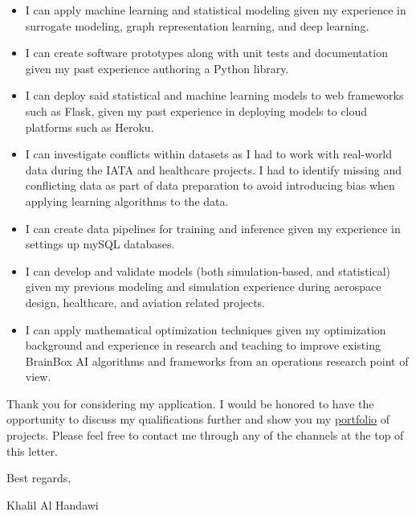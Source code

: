 \documentclass[12pt]{article} %
\begin{document}
\begin{itemize}
	\item I can apply machine learning and statistical modeling given my experience in surrogate modeling, graph representation learning, and deep learning.
	\item I can create software prototypes along with unit tests and documentation given my past experience authoring a Python library.
	\item I can deploy said statistical and machine learning models to web frameworks such as Flask, given my past experience in deploying models to cloud platforms such as Heroku.
	\item I can investigate conflicts within datasets as I had to work with real-world data during the IATA and healthcare projects. I had to identify missing and conflicting data as part of data preparation to avoid introducing bias when applying learning algorithms to the data.
	\item I can create data pipelines for training and inference given my experience in settings up mySQL databases.
	\item I can develop and validate models (both simulation-based, and statistical) given my previous modeling and simulation experience during aerospace design, healthcare, and aviation related projects.
	\item I can apply mathematical optimization techniques given my optimization background and experience in research and teaching to improve existing BrainBox AI algorithms and frameworks from an operations research point of view.
\end{itemize}

\medskip %

Thank you for considering my application. I would be honored to have the opportunity to discuss my qualifications further and show you my \href{https://khbalhandawi.github.io/projects/}{portfolio} of projects. Please feel free to contact me through any of the channels at the top of this letter.

\medskip %

Best regards,

\medskip %


Khalil Al Handawi


\medskip %

\end{document}

